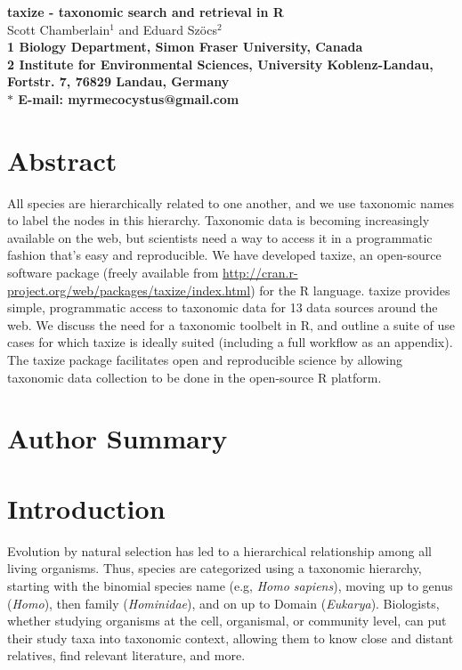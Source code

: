 \documentclass[10pt]{article}\usepackage[]{graphicx}\usepackage[]{color}
\date{}
\begin{document}
\begin{flushleft}
{\Large
\textbf{taxize - taxonomic search and retrieval in R}
}
\\
Scott Chamberlain$^{1}$ and 
Eduard Sz\"{o}cs$^{2}$
\\
\bf{1} Biology Department, Simon Fraser University, Canada
\\
\bf{2} Institute for Environmental Sciences, University Koblenz-Landau, Fortstr. 7, 76829 Landau, Germany
\\
$\ast$ E-mail: myrmecocystus@gmail.com
\end{flushleft}

\section*{Abstract}
All species are hierarchically related to one another, and we use taxonomic names to label the nodes in this hierarchy. Taxonomic data is becoming increasingly available on the web, but scientists need a way to access it in a programmatic fashion that's easy and reproducible. We have developed taxize, an open-source software package (freely available from \url{http://cran.r-project.org/web/packages/taxize/index.html}) for the R language. taxize provides simple, programmatic access to taxonomic data for 13 data sources around the web. We discuss the need for a taxonomic toolbelt in R, and outline a suite of use cases for which taxize is ideally suited (including a full workflow as an appendix). The taxize package facilitates open and reproducible science by allowing taxonomic data collection to be done in the open-source R platform.

\section*{Author Summary}

\section*{Introduction}
Evolution by natural selection has led to a hierarchical relationship among all living organisms.  Thus, species are categorized using a taxonomic hierarchy, starting with the binomial species name (e.g, \emph{Homo sapiens}), moving up to genus (\emph{Homo}), then family (\emph{Hominidae}), and on up to Domain (\emph{Eukarya}). Biologists, whether studying organisms at the cell, organismal, or community level, can put their study taxa into taxonomic context, allowing them to know close and distant relatives, find relevant literature, and more. 
\end{document}
